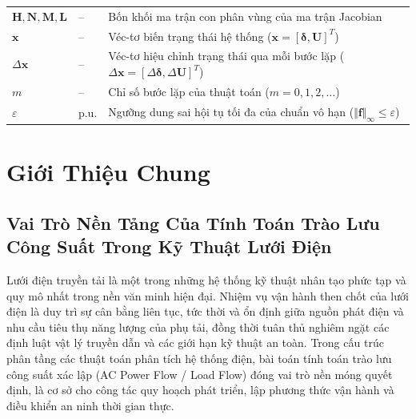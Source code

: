 \documentclass[12pt,a4paper,oneside]{report}
\begin{document}
\begin{longtable}{p{2.2cm}p{1.5cm}p{10.5cm}}
$\mathbf{H}, \mathbf{N}, \mathbf{M}, \mathbf{L}$ & -- & Bốn khối ma trận con phân vùng của ma trận Jacobian \\
$\mathbf{x}$ & -- & Véc-tơ biến trạng thái hệ thống ($\mathbf{x} = [\boldsymbol{\delta}, \mathbf{U}]^T$) \\
$\Delta \mathbf{x}$ & -- & Véc-tơ hiệu chỉnh trạng thái qua mỗi bước lặp ($\Delta \mathbf{x} = [\Delta \boldsymbol{\delta}, \Delta \mathbf{U}]^T$) \\
$m$ & -- & Chỉ số bước lặp của thuật toán ($m = 0, 1, 2, \dots$) \\
$\varepsilon$ & p.u. & Ngưỡng dung sai hội tụ tối đa của chuẩn vô hạn ($\Vert \mathbf{f} \Vert_\infty \le \varepsilon$) \\
\bottomrule
\end{longtable}

\clearpage

\tableofcontents
\clearpage

\listoftables
\clearpage

\listoffigures
\clearpage

\setcounter{page}{1}

\chapter{Giới Thiệu Chung}

\section{Vai Trò Nền Tảng Của Tính Toán Trào Lưu Công Suất Trong Kỹ Thuật Lưới Điện}
Lưới điện truyền tải là một trong những hệ thống kỹ thuật nhân tạo phức tạp và quy mô nhất trong nền văn minh hiện đại. Nhiệm vụ vận hành then chốt của lưới điện là duy trì sự cân bằng liên tục, tức thời và ổn định giữa nguồn phát điện và nhu cầu tiêu thụ năng lượng của phụ tải, đồng thời tuân thủ nghiêm ngặt các định luật vật lý truyền dẫn và các giới hạn kỹ thuật an toàn. Trong cấu trúc phân tầng các thuật toán phân tích hệ thống điện, bài toán tính toán trào lưu công suất xác lập (AC Power Flow / Load Flow) đóng vai trò nền móng quyết định, là cơ sở cho công tác quy hoạch phát triển, lập phương thức vận hành và điều khiển an ninh thời gian thực.
\end{document}
